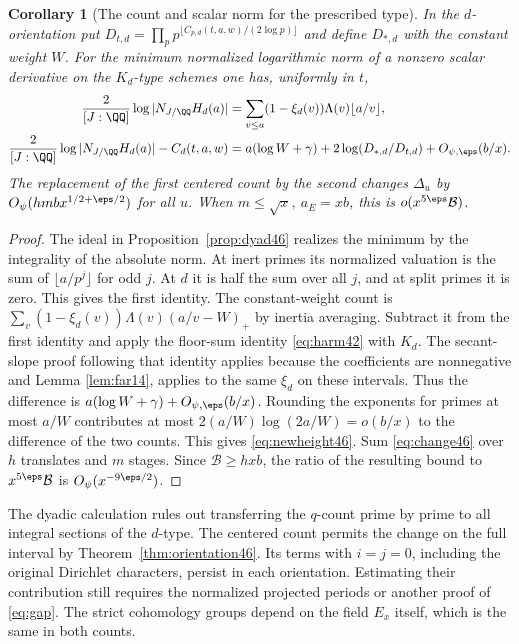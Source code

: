 \documentclass[a4paper,11pt]{article}
\newtheorem{corollary}[proposition]{Corollary}
\theoremstyle{definition}
\theoremstyle{remark}
\numberwithin{equation}{section}
\begin{document}
\begin{corollary}[The count and scalar norm for the prescribed type]\label{cor:prescribed46}
In the \(d\)-orientation put
\(D_{t,d}=\prod_p p^{\lfloor C_{p,d}(t,a,w)/(2\log p)\rfloor}\)
and define \(D_{*,d}\) with the constant weight \(W\). For the minimum
normalized logarithmic norm of a nonzero scalar derivative on the
\(K_d\)-type schemes one has, uniformly in \(t\),
\begin{align}
 \frac{2}{[J:\QQ]}\log|N_{J/\QQ}H_d(a)|
    &=\sum_{v\le a}(1-\xi_d(v))\Lambda(v)\lfloor a/v\rfloor, \notag\\
 \frac{2}{[J:\QQ]}\log|N_{J/\QQ}H_d(a)|-C_d(t,a,w)
    &=a(\log W+\gamma)+2\log(D_{*,d}/D_{t,d})
                         +O_{\psi,\eps}(b/x).                     \label{eq:newheight46}
\end{align}
The replacement of the first centered count by the second changes
\(\Delta_u\) by \(O_\psi(hm b x^{1/2+\eps/2})\) for all \(u\).
When \(m\le\sqrt x,\ a_E=xb\), this is \(o(x^{5\eps}\mathcal B)\).
\end{corollary}
\begin{proof}
The ideal in Proposition~\ref{prop:dyad46} realizes the minimum by the
integrality of the absolute norm. At inert primes its normalized
valuation is the sum of \(\lfloor a/p^j\rfloor\) for odd \(j\).
At \(d\) it is half the sum over all \(j\), and at split primes it is
zero. This gives the first identity. The constant-weight count is
\(\sum_v(1-\xi_d(v))\Lambda(v)(a/v-W)_+\) by inertia averaging.
Subtract it from the first identity and apply the floor-sum identity
\eqref{eq:harm42} with \(K_d\). The secant-slope proof following that
identity applies because the coefficients are nonnegative and Lemma \ref{lem:far14}, applies to the same \(\xi_d\) on these intervals. Thus the
difference is \(a(\log W+\gamma)+O_{\psi,\eps}(b/x)\). Rounding the
exponents for primes at most \(a/W\) contributes at most
\(2(a/W)\log(2a/W)=o(b/x)\) to the difference of the two counts.
This gives \eqref{eq:newheight46}. Sum \eqref{eq:change46} over \(h\)
translates and \(m\) stages. Since \(\mathcal B\ge hxb\), the ratio of
the resulting bound to \(x^{5\eps}\mathcal B\) is
\(O_\psi(x^{-9\eps/2})\).
\end{proof}

The dyadic calculation rules out transferring the \(q\)-count
prime by prime to all integral sections of the \(d\)-type. The
centered count permits the change on the full interval by
Theorem~\ref{thm:orientation46}. Its terms with \(i=j=0\), including the
original Dirichlet characters, persist in each orientation. Estimating
their contribution still requires the normalized projected periods or
another proof of \eqref{eq:gap}. The strict cohomology groups depend on
the field \(E_x\) itself, which is the same in both counts.
\end{document}
